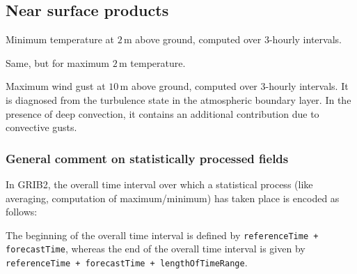 \subsection{Near surface products}
\begin{description}[leftmargin=3.0cm,style=sameline]
  \item [TMIN\_2M]  Minimum temperature at $2\,\mathrm{m}$ above ground, computed over $3$-hourly intervals. 
  \item [TMAX\_2M]  Same, but for maximum $2\,\mathrm{m}$ temperature.
  \item [VMAX\_10M] Maximum wind gust at $10\,\mathrm{m}$ above ground, computed over $3$-hourly intervals. It is diagnosed 
                    from the turbulence state in the atmospheric boundary layer. In the presence of deep convection, it 
                    contains an additional contribution due to convective gusts.
\end{description}



\subsubsection{General comment on statistically processed fields}

In GRIB2, the overall time interval over which a statistical process (like averaging, computation of maximum/minimum) has taken place is 
encoded as follows:

The beginning of the overall time interval is defined by \texttt{referenceTime + forecastTime}, whereas the end of the 
overall time interval is given by \texttt{referenceTime + forecastTime + lengthOfTimeRange}.




